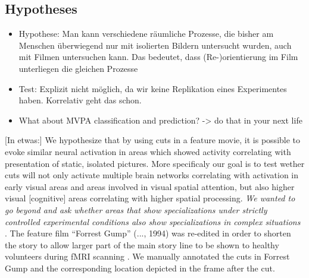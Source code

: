 \documentclass[10pt,a4paper,twocolumn]{article}
\begin{document}
\subsection*{Hypotheses }
\begin{itemize}
	\item Hypothese: Man kann verschiedene räumliche Prozesse, die bisher am
	Menschen überwiegend nur mit isolierten Bildern untersucht wurden,
	auch mit Filmen untersuchen kann. Das bedeutet, dass (Re-)orientierung
	im Film unterliegen die gleichen Prozesse
	\item Test: Explizit nicht möglich, da wir keine Replikation eines Experimentes
	haben. Korrelativ geht das schon. 
	\item What about MVPA classification and prediction? -> do that in your
	next life
\end{itemize}
{[}In etwas:{]} We hypothesize that by using cuts in a feature movie,
it is possible to evoke similar neural activation in areas which showed
activity correlating with presentation of static, isolated pictures.
More specificaly our goal is to test wether cuts will not only activate
multiple brain networks correlating with activation in early visual
areas and areas involved in visual spatial attention, but also higher
visual {[}cognitive{]} areas correlating with higher spatial processing.
\emph{We wanted to go beyond and ask whether areas that show specializations
	under strictly controlled experimental conditions also show specializations
	in complex situations \citet{bartels_2004_mapping_during_free_viewing}}.
The feature film ``Forrest Gump'' (..., 1994) was re-edited in order
to shorten the story to allow larger part of the main story line to
be shown to healthy volunteers during fMRI scanning \citep{hanke_2016_simultaneous_fMRI_eye_gaze}.
We manually annotated the cuts in Forrest Gump and the corresponding
location depicted in the frame after the cut. 
\end{document}
